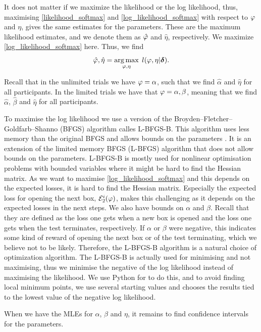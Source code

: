 It does not matter if we maximize the likelihood or the log likelihood, thus, maximising \eqref{likelihood_softmax} and \eqref{log_likelihood_softmax} with respect to $\varphi$ and $\eta$, gives the same estimates for the parameters. These are the maximum likelihood estimates, and we denote them as $\hat{\varphi}$ and $\hat{\eta}$, respectively. We maximize \eqref{log_likelihood_softmax} here. Thus, we find
\begin{equation}
    \hat{\varphi},\hat{\eta} = \underset{\varphi,\eta}{\mathrm{arg}\,\mathrm{max}}\:\: l(\varphi,\eta|\boldsymbol{\delta}) .
\end{equation}

Recall that in the unlimited trials we have $\varphi=\alpha$, such that we find $\hat{\alpha}$ and $\hat{\eta}$ for all participants. In the limited trials we have that $\varphi=\alpha,\beta$, meaning that we find $\hat{\alpha}$, $\hat{\beta}$ and $\hat{\eta}$ for all participants.


To maximise the log likelihood we use a version of the Broyden–Fletcher–Goldfarb–Shanno (BFGS) algorithm calles L-BFGS-B. This algorithm uses less memory than the original BFGS and allows bounds on the parameters \citep{optimization2}. It is an extension of the limited memory BFGS (L-BFGS) algorithm that does not allow bounds on the parameters. L-BFGS-B is mostly used for nonlinear optimisation problems with bounded variables where it might be hard to find the Hessian matrix. 
As we want to maximise \eqref{log_likelihood_softmax} and this depends on the expected losses, it is hard to find the Hessian matrix. Especially the expected loss for opening the next box, $\mathcal{E}_2^i(\varphi)$, makes this challenging as it depends on the expected losses in the next steps. We also have bounds on $\alpha$ and $\beta$. Recall that they are defined as the loss one gets when a new box is opened and the loss one gets when the test terminates, respectively. If $\alpha$ or $\beta$ were negative, this indicates some kind of reward of opening the next box or of the test terminating, which we believe not to be likely. Therefore, the L-BFGS-B algorithm is a natural choice of optimization algorithm. The L-BFGS-B is actually used for minimising and not maximising, thus we minimise the negative of the log likelihood instead of maximising the likelihood. We use Python for to do this, and to avoid finding local minimum points, we use several starting values and chooses the results tied to the lowest value of the negative log likelihood. 

When we have the MLEs for $\alpha$, $\beta$ and $\eta$, it remains to find confidence intervals for the parameters. 


